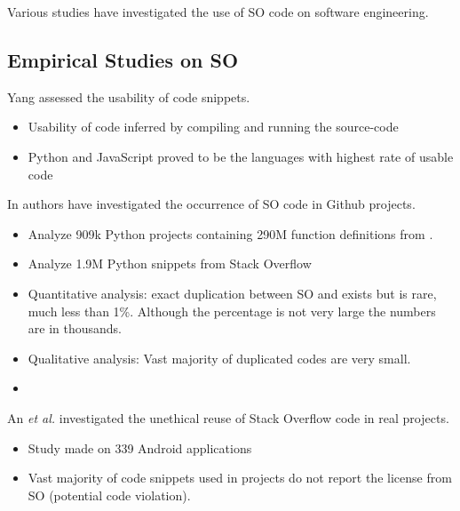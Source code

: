 \newpage
\phantom{blabla}
\newpage

Various studies have investigated the use of SO code on software engineering.


\subsection{Empirical Studies on SO}

Yang \cite{Yang:2016_FromQueryToUsableCode} assessed the usability of code snippets.
\begin{itemize}
	\item Usability of code inferred by compiling and running the source-code
	\item Python and JavaScript proved to be the languages with highest rate of usable code
\end{itemize}

In \cite{Yang:2017_AnySnippetsThere} authors have investigated the occurrence of SO code in Github projects.
\begin{itemize}
	\item Analyze 909k Python projects containing 290M function definitions from \github.
	\item Analyze 1.9M Python snippets from Stack Overflow
	\item Quantitative analysis: exact duplication between SO and \github exists but is rare, much less than 1\%. Although the percentage is not very large the numbers are in thousands.
	\item Qualitative analysis: Vast majority of duplicated codes are very small.
	\item {}
\end{itemize}

An \textit{et al.} \cite{An:2017_SOACodeLaunderingPlatform} investigated the unethical reuse of Stack Overflow code in real projects.
\begin{itemize}
	\item Study made on 339 Android applications
	\item Vast majority  of code snippets used in projects do not report the license from SO (potential code violation).
\end{itemize}

